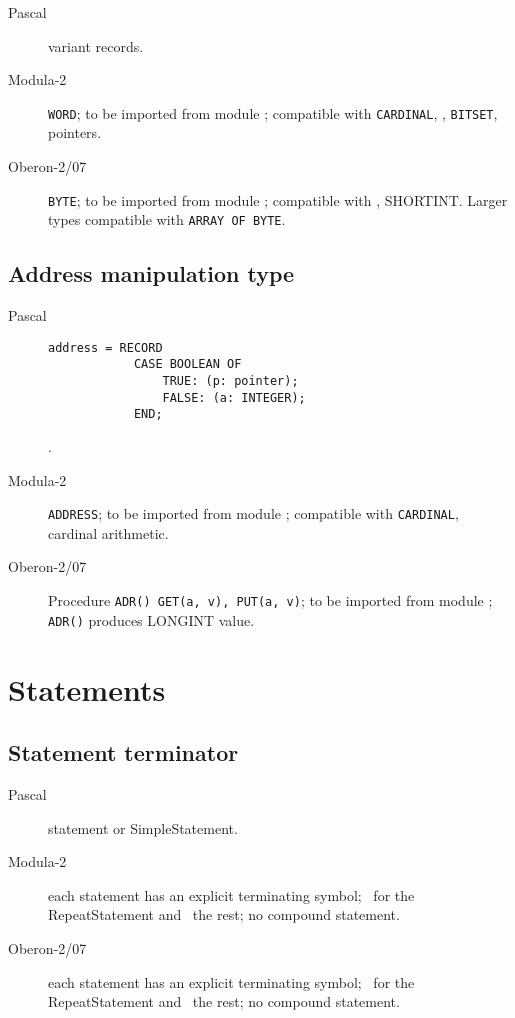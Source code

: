 \documentclass[10pt]{article}
\begin{document}
\begin{description}
    \item[Pascal] variant records.
    \item[Modula-2] \lstinline!WORD!; to be imported from module \SYSTEM; compatible with \lstinline!CARDINAL!, \INTEGER, \lstinline!BITSET!, pointers.
    \item[Oberon-2/07] \lstinline!BYTE!; to be imported from module \SYSTEM; compatible with \CHAR, SHORTINT. Larger types compatible with \lstinline!ARRAY OF BYTE!.
\end{description}

\subsection{Address manipulation type}

\begin{description}
    \item[Pascal]  \begin{lstlisting}[style=example]   
        address = RECORD
            CASE BOOLEAN OF 
                TRUE: (p: pointer); 
                FALSE: (a: INTEGER);
            END;
        \end{lstlisting}.
    \item[Modula-2] \lstinline!ADDRESS!; to be imported from module \SYSTEM; compatible with \lstinline!CARDINAL!, cardinal arithmetic.
    \item[Oberon-2/07] Procedure \lstinline!ADR() GET(a, v), PUT(a, v)!; to be imported from module \SYSTEM; \lstinline!ADR()! produces LONGINT value.
\end{description}

\section{Statements}

\subsection{Statement terminator}

\begin{description}
    \item[Pascal] statement or SimpleStatement.
    \item[Modula-2] each statement has an explicit terminating symbol; \UNTIL\ for the RepeatStatement and \END\ the rest; no compound statement.
    \item[Oberon-2/07] each statement has an explicit terminating symbol; \UNTIL\ for the RepeatStatement and \END\ the rest; no compound statement. 
\end{description}
\end{document}
